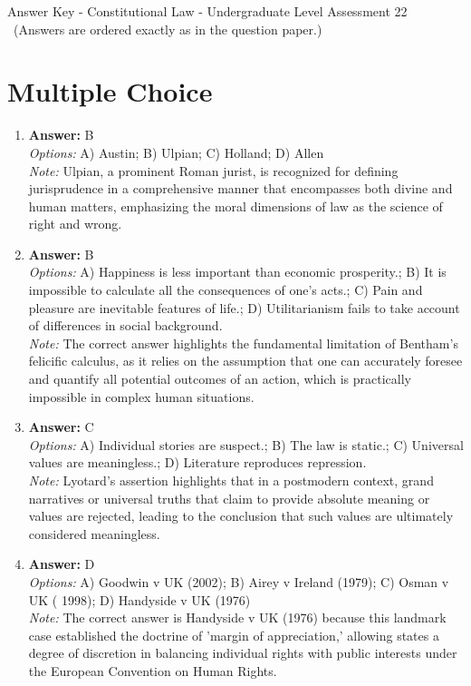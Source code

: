 \documentclass[12pt]{article}
\begin{document}
\begin{center}
Answer Key - Constitutional Law - Undergraduate Level Assessment 22 \
\small (Answers are ordered exactly as in the question paper.)
\end{center}

\section*{Multiple Choice}
\begin{enumerate}[label=\arabic*.]
\item \textbf{Answer:} B
\\ \textit{Options:} A) Austin; B) Ulpian; C) Holland; D) Allen
\\ \textit{Note:} Ulpian, a prominent Roman jurist, is recognized for defining jurisprudence in a comprehensive manner that encompasses both divine and human matters, emphasizing the moral dimensions of law as the science of right and wrong.
\item \textbf{Answer:} B
\\ \textit{Options:} A) Happiness is less important than economic prosperity.; B) It is impossible to calculate all the consequences of one's acts.; C) Pain and pleasure are inevitable features of life.; D) Utilitarianism fails to take account of differences in social background.
\\ \textit{Note:} The correct answer highlights the fundamental limitation of Bentham's felicific calculus, as it relies on the assumption that one can accurately foresee and quantify all potential outcomes of an action, which is practically impossible in complex human situations.
\item \textbf{Answer:} C
\\ \textit{Options:} A) Individual stories are suspect.; B) The law is static.; C) Universal values are meaningless.; D) Literature reproduces repression.
\\ \textit{Note:} Lyotard's assertion highlights that in a postmodern context, grand narratives or universal truths that claim to provide absolute meaning or values are rejected, leading to the conclusion that such values are ultimately considered meaningless.
\item \textbf{Answer:} D
\\ \textit{Options:} A) Goodwin v UK (2002); B) Airey v Ireland (1979); C) Osman v UK ( 1998); D) Handyside v UK (1976)
\\ \textit{Note:} The correct answer is Handyside v UK (1976) because this landmark case established the doctrine of 'margin of appreciation,' allowing states a degree of discretion in balancing individual rights with public interests under the European Convention on Human Rights.

\end{enumerate}
\end{document}
